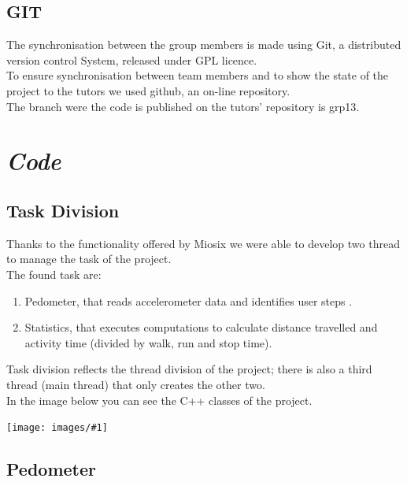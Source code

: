 \documentclass[a4paper,12pt,oneside]{report}
\newcommand{\imageinsert}[3]{
\begin{center}
\texttt{[image: images/\#1]}
\captionof{figure}{#2}
\end{center}}
\begin{document}
\section{GIT}

The synchronisation between the group members is made using Git,
a distributed version control System, released under GPL licence.\\
To ensure synchronisation between team members and to show the state of the project to 
the tutors we used github, an on-line repository.\\
The branch were the code is published on the tutors' repository is grp13.

\newpage{}

\chapter{\textit{Code}}


\section{Task Division}

Thanks to the functionality offered  by Miosix we were able to develop two thread to manage the task of the project.\\
The found task are:
\begin{enumerate}
\item Pedometer, that reads accelerometer data and identifies user steps .
\item Statistics, that executes computations to calculate distance travelled and activity time 
(divided by walk, run and stop time).
\end{enumerate}
Task division reflects the thread division of the project;
there is also a third thread (main thread) that only creates the other two.\\
In the image below you can see the C++ classes of the project.
\imageinsert{classDiagram.jpg}{Class Diagram}{0.5}

\section{Pedometer}
\end{document}

